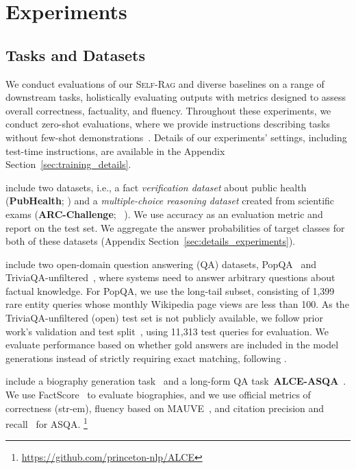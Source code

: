 \documentclass{article} %
\newcommand{\model}{\textsc{Self-Rag}\xspace}
\begin{document}
\section{Experiments}

\subsection{Tasks and Datasets} 
We conduct evaluations of our \model and diverse baselines on a range of downstream tasks, holistically evaluating outputs with metrics designed to assess overall correctness, factuality, and fluency. 
Throughout these experiments, we conduct zero-shot evaluations, where we provide instructions describing tasks without few-shot demonstrations~\citep{wei2022finetuned,sanh2022multitask}. 
Details of our experiments' settings, including test-time instructions, are available in the Appendix Section~\ref{sec:training_details}. 


 include two datasets, i.e., a fact \textit{verification dataset} about public health ({\bf PubHealth}; \citealt{zhang2023interpretable}) and a \textit{multiple-choice reasoning dataset} created from scientific exams ({\bf ARC-Challenge}; ~\citealt{clark2018think}). 
We use accuracy as an evaluation metric and report on the test set. 
We aggregate the answer probabilities of target classes for both of these datasets (Appendix Section~\ref{sec:details_experiments}). 
 

 include two open-domain question answering (QA) datasets, PopQA~\citep{mallen2022not} and TriviaQA-unfiltered~\citep{joshi-etal-2017-triviaqa}, where systems need to answer arbitrary questions about factual knowledge. 
For PopQA, we use the long-tail subset, consisting of 1,399 rare entity queries whose monthly Wikipedia page views are less than 100. 
As the TriviaQA-unfiltered (open) test set is not publicly available, we follow prior work's validation and test split~\citep{min-etal-2019-discrete,guu2020retrieval}, using 11,313 test queries for evaluation. 
We evaluate performance based on whether gold answers are included in the model generations instead of strictly requiring exact matching, following \cite{mallen2022not,schick2023toolformer}. 

 include a biography generation task~\citep{min2023factscore} and a long-form QA task~{\bf ALCE-ASQA}~\cite{gao2023enabling,stelmakh2022asqa}. 
We use FactScore~\citep{min2023factscore} to evaluate biographies, and we use official metrics of correctness (str-em), fluency based on MAUVE~\citep{pillutla2021MAUVE}, and citation precision and recall~\citep{gao2023enabling} for ASQA. \footnote{\url{https://github.com/princeton-nlp/ALCE}} 
\end{document}
